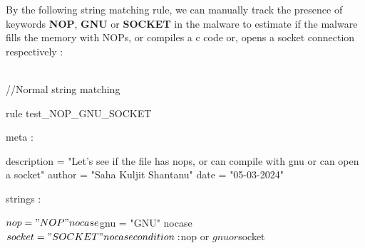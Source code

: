 By the following string matching rule, we can manually track the presence of keywords \textbf{NOP}, \textbf{GNU} or \textbf{SOCKET} in the malware to estimate if the malware fills the memory with NOPs, or compiles a c code or, opens a socket connection respectively : \\ \\

\begin{yaracode}

//Normal string matching

rule test_NOP_GNU_SOCKET { 

    meta : 

        description = "Let's see if the file has nops, or can compile with gnu or can open a socket"
        author = "Saha Kuljit Shantanu"
        date = "05-03-2024"

    strings :

        $nop = "NOP" nocase
        $gnu = "GNU" nocase
        $socket = "SOCKET" nocase

    
    condition: 

        $nop or $gnu or $socket
    
    
}

\end{yaracode}
